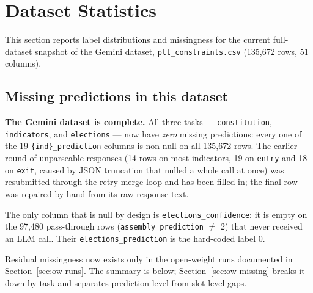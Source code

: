 \documentclass[11pt, a4paper]{article}
\begin{document}
\section{Dataset Statistics}

This section reports label distributions and missingness for the current full-dataset snapshot
of the Gemini dataset, \texttt{\allowbreak plt\_\allowbreak constraints.csv} (135{,}672 rows,
51 columns).

\subsection{Missing predictions in this dataset}

\textbf{The Gemini dataset is complete.} All three tasks --- \texttt{constitution},
\texttt{indicators}, and \texttt{elections} --- now have \emph{zero} missing predictions:
every one of the 19 \texttt{\{ind\}\_\allowbreak prediction} columns is non-null on all
135{,}672 rows. The earlier round of unparseable responses (14 rows on most indicators,
19 on \texttt{entry} and 18 on \texttt{exit}, caused by JSON truncation that nulled a whole
call at once) was resubmitted through the retry-merge loop and has been filled in; the
final row was repaired by hand from its raw response text.

The only column that is null by design is \texttt{elections\_\allowbreak confidence}: it is
empty on the 97{,}480 pass-through rows
(\texttt{assembly\_\allowbreak prediction} $\neq$ 2) that never received an LLM call.
Their \texttt{elections\_\allowbreak prediction} is the hard-coded label 0.

Residual missingness now exists only in the open-weight runs documented in
Section~\ref{sec:ow-runs}. The summary is below; Section~\ref{sec:ow-missing} breaks it
down by task and separates prediction-level from slot-level gaps.
\end{document}
